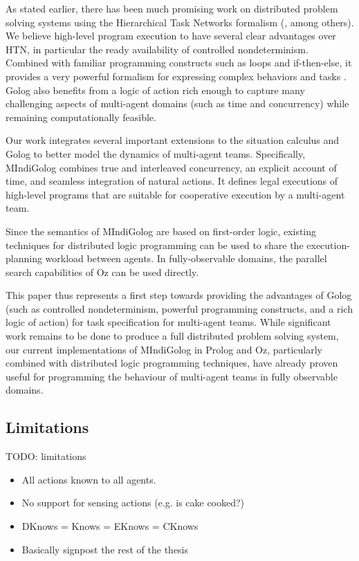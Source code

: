 As stated earlier, there has been much promising work on distributed
problem solving systems using the Hierarchical Task Networks formalism
(\citet{tambe97flexible_teamwork,decker95designing_coordination,grosz99planning_together},
among others). We believe high-level program execution to have several
clear advantages over HTN, in particular the ready availability of
controlled nondeterminism. Combined with familiar programming constructs
such as loops and if-then-else, it provides a very powerful formalism
for expressing complex behaviors and tasks \citet{Gabaldon02htn_in_golog,son00htn_golog}.
Golog also benefits from a logic of action rich enough to capture
many challenging aspects of multi-agent domains (such as time and
concurrency) while remaining computationally feasible.

Our work integrates several important extensions to the situation
calculus and Golog to better model the dynamics of multi-agent teams.
Specifically, MIndiGolog combines true and interleaved concurrency,
an explicit account of time, and seamless integration of natural actions.
It defines legal executions of high-level programs that are suitable
for cooperative execution by a multi-agent team.

Since the semantics of MIndiGolog are based on first-order logic,
existing techniques for distributed logic programming can be used
to share the execution-planning workload between agents. In fully-observable
domains, the parallel search capabilities of Oz can be used directly.

This paper thus represents a first step towards providing the advantages
of Golog (such as controlled nondeterminism, powerful programming
constructs, and a rich logic of action) for task specification for
multi-agent teams. While significant work remains to be done to produce
a full distributed problem solving system, our current implementations
of MIndiGolog in Prolog and Oz, particularly combined with distributed
logic programming techniques, have already proven useful for programming
the behaviour of multi-agent teams in fully observable domains.


\subsection{Limitations}

TODO: limitations

\begin{itemize}
\item All actions known to all agents. 
\item No support for sensing actions (e.g. is cake cooked?) 
\item DKnows = Knows = EKnows = CKnows 
\item Basically signpost the rest of the thesis 
\end{itemize}

